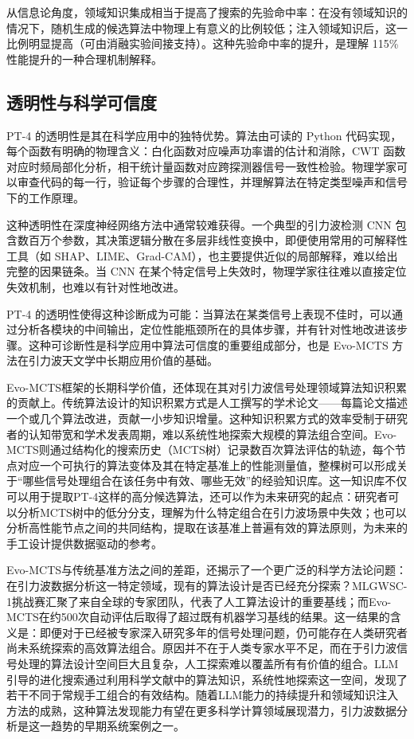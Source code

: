 从信息论角度，领域知识集成相当于提高了搜索的先验命中率：在没有领域知识的情况下，随机生成的候选算法中物理上有意义的比例较低；注入领域知识后，这一比例明显提高（可由消融实验间接支持）。这种先验命中率的提升，是理解 115\% 性能提升的一种合理机制解释。

\subsection{透明性与科学可信度}

PT-4 的透明性是其在科学应用中的独特优势。算法由可读的 Python 代码实现，每个函数有明确的物理含义：白化函数对应噪声功率谱的估计和消除，CWT 函数对应时频局部化分析，相干统计量函数对应跨探测器信号一致性检验。物理学家可以审查代码的每一行，验证每个步骤的合理性，并理解算法在特定类型噪声和信号下的工作原理。

这种透明性在深度神经网络方法中通常较难获得。一个典型的引力波检测 CNN 包含数百万个参数，其决策逻辑分散在多层非线性变换中，即便使用常用的可解释性工具（如 SHAP、LIME、Grad-CAM），也主要提供近似的局部解释，难以给出完整的因果链条。当 CNN 在某个特定信号上失效时，物理学家往往难以直接定位失效机制，也难以有针对性地改进。

PT-4 的透明性使得这种诊断成为可能：当算法在某类信号上表现不佳时，可以通过分析各模块的中间输出，定位性能瓶颈所在的具体步骤，并有针对性地改进该步骤。这种可诊断性是科学应用中算法可信度的重要组成部分，也是 Evo-MCTS 方法在引力波天文学中长期应用价值的基础。

Evo-MCTS框架的长期科学价值，还体现在其对引力波信号处理领域算法知识积累的贡献上。传统算法设计的知识积累方式是人工撰写的学术论文——每篇论文描述一个或几个算法改进，贡献一小步知识增量。这种知识积累方式的效率受制于研究者的认知带宽和学术发表周期，难以系统性地探索大规模的算法组合空间。Evo-MCTS则通过结构化的搜索历史（MCTS树）记录数百次算法评估的轨迹，每个节点对应一个可执行的算法变体及其在特定基准上的性能测量值，整棵树可以形成关于“哪些信号处理组合在该任务中有效、哪些无效”的经验知识库。这一知识库不仅可以用于提取PT-4这样的高分候选算法，还可以作为未来研究的起点：研究者可以分析MCTS树中的低分分支，理解为什么特定组合在引力波场景中失效；也可以分析高性能节点之间的共同结构，提取在该基准上普遍有效的算法原则，为未来的手工设计提供数据驱动的参考。

Evo-MCTS与传统基准方法之间的差距，还揭示了一个更广泛的科学方法论问题：在引力波数据分析这一特定领域，现有的算法设计是否已经充分探索？MLGWSC-1挑战赛汇聚了来自全球的专家团队，代表了人工算法设计的重要基线；而Evo-MCTS在约500次自动评估后取得了超过既有机器学习基线的结果。这一结果的含义是：即便对于已经被专家深入研究多年的信号处理问题，仍可能存在人类研究者尚未系统探索的高效算法组合。原因并不在于人类专家水平不足，而在于引力波信号处理的算法设计空间巨大且复杂，人工探索难以覆盖所有有价值的组合。LLM引导的进化搜索通过利用科学文献中的算法知识，系统性地探索这一空间，发现了若干不同于常规手工组合的有效结构。随着LLM能力的持续提升和领域知识注入方法的成熟，这种算法发现能力有望在更多科学计算领域展现潜力，引力波数据分析是这一趋势的早期系统案例之一。

